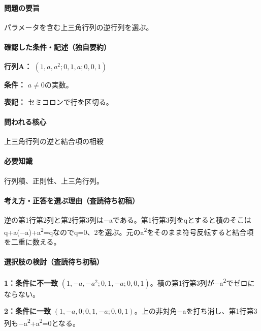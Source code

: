 \paragraph{問題の要旨} パラメータを含む上三角行列の逆行列を選ぶ。

\paragraph{確認した条件・記述（独自要約）}\mbox{}\par

\noindent\textbf{行列A：} \((1,a,a^2;0,1,a;0,0,1)\)\par

\noindent\textbf{条件：} \(a\neq0\)の実数。\par

\noindent\textbf{表記：} セミコロンで行を区切る。\par

\paragraph{問われる核心} 上三角行列の逆と結合項の相殺

\paragraph{必要知識} 行列積、正則性、上三角行列。

\paragraph{考え方・正答を選ぶ理由（査読待ち初稿）} 逆の第1行第2列と第2行第3列は−aである。第1行第3列をqとすると積のそこはq+a(−a)+a\textsuperscript{2}=qなのでq=\allowbreak{}0、2を選ぶ。元のa\textsuperscript{2}をそのまま符号反転すると結合項を二重に数える。

\paragraph{選択肢の検討（査読待ち初稿）}\mbox{}\par

\noindent\textbf{1：条件に不一致} \((1,-a,-a^2;0,1,-a;0,0,1)\)。積の第1行第3列が−a\textsuperscript{2}でゼロにならない。\par

\noindent\textbf{2：条件に一致} \((1,-a,0;0,1,-a;0,0,1)\)。上の非対角−aを打ち消し、第1行第3列も−a\textsuperscript{2}+a\textsuperscript{2}=0となる。\par

